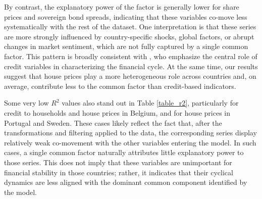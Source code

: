 By contrast, the explanatory power of the factor is generally lower for share prices and sovereign bond spreads, indicating that these variables co-move less systematically with the rest of the dataset. One interpretation is that these series are more strongly influenced by country-specific shocks, global factors, or abrupt changes in market sentiment, which are not fully captured by a single common factor. This pattern is broadly consistent with \citet{drehmann2012characterising}, who emphasize the central role of credit variables in characterizing the financial cycle. At the same time, our results suggest that house prices play a more heterogeneous role across countries and, on average, contribute less to the common factor than credit-based indicators.

Some very low $R^2$ values also stand out in Table \ref{table_r2}, particularly for credit to households and house prices in Belgium, and for house prices in Portugal and Sweden. These cases likely reflect the fact that, after the transformations and filtering applied to the data, the corresponding series display relatively weak co-movement with the other variables entering the model. In such cases, a single common factor naturally attributes little explanatory power to those series. This does not imply that these variables are unimportant for financial stability in those countries; rather, it indicates that their cyclical dynamics are less aligned with the dominant common component identified by the model.

